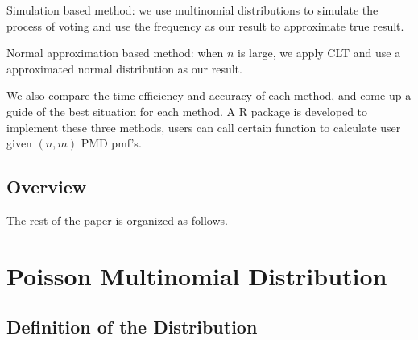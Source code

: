 \documentclass[12pt]{article}
\begin{document}
Simulation based method: we use multinomial distributions to simulate the process of voting and use the frequency as our result to approximate true result.

Normal approximation based method: when $n$ is large, we apply CLT and use a approximated normal distribution as our result.


We also compare the time efficiency and accuracy of each method, and come up a guide of the best situation for each method. A R package is developed to implement these three methods, users can call certain function to calculate user given $(n,m)$ PMD pmf's.




\subsection{Overview}
The rest of the paper is organized as follows.



\section{Poisson Multinomial Distribution}
\subsection{Definition of the Distribution}
		
\end{document}
